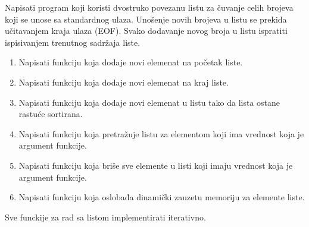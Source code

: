 \begin{Exercise}[label=604]
Napisati program koji koristi dvostruko povezanu listu za čuvanje
celih brojeva koji se unose sa standardnog ulaza. 
Unošenje novih brojeva u listu se prekida učitavanjem kraja ulaza (EOF). 
Svako dodavanje novog broja u listu ispratiti ispisivanjem trenutnog sadržaja liste. 
\begin{enumerate}
 \item Napisati funkciju koja dodaje novi elemenat na početak liste.
 \item Napisati funkciju koja dodaje novi elemenat na kraj liste.
 \item Napisati funkciju koja dodaje novi elemenat u listu tako da lista ostane rastuće sortirana.
 \item Napisati funkciju koja pretražuje listu za elementom koji ima vrednost koja je argument funkcije.
 \item Napisati funkciju koja briše sve elemente u listi koji imaju vrednost koja je argument funkcije.
 \item Napisati funkciju koja oslobađa dinamički zauzetu memoriju za elemente liste.

\end{enumerate}
Sve funckije za rad sa listom implementirati iterativno.
\end{Exercise}
\begin{Answer}[ref=604]
\end{Answer}



